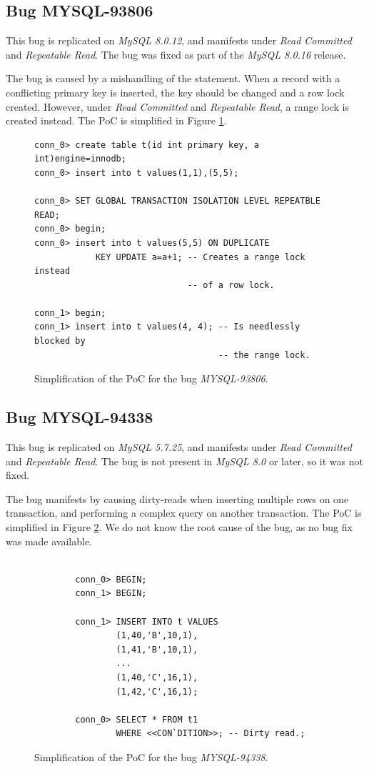\subsection*{Bug MYSQL-93806}

This bug is replicated on \textit{MySQL 8.0.12}, and manifests under \textit{Read Committed} and \textit{Repeatable Read}. The bug was fixed as part of the \textit{MySQL 8.0.16} release.

The bug is caused by a mishandling of the  statement. When a record with a conflicting primary key is inserted, the key should be changed and a row lock created. However, under \textit{Read Committed} and \textit{Repeatable Read}, a range lock is created instead. The PoC is simplified in Figure \ref{fig:MYSQL-93806}.

\begin{figure}
\begin{verbatim}
conn_0> create table t(id int primary key, a int)engine=innodb;
conn_0> insert into t values(1,1),(5,5);

conn_0> SET GLOBAL TRANSACTION ISOLATION LEVEL REPEATBLE READ;
conn_0> begin;
conn_0> insert into t values(5,5) ON DUPLICATE
            KEY UPDATE a=a+1; -- Creates a range lock instead
                              -- of a row lock.

conn_1> begin;
conn_1> insert into t values(4, 4); -- Is needlessly blocked by
                                    -- the range lock.
\end{verbatim}
\caption{Simplification of the PoC for the bug \textit{MYSQL-93806}.} \label{fig:MYSQL-93806}
\end{figure}


\subsection*{Bug MYSQL-94338}

This bug is replicated on \textit{MySQL 5.7.25}, and manifests under \textit{Read Committed} and \textit{Repeatable Read}. The bug is not present in \textit{MySQL 8.0} or later, so it was not fixed.

The bug manifests by causing dirty-reads when inserting multiple rows on one transaction, and performing a complex query on another transaction. The PoC is simplified in Figure \ref{fig:MYSQL-94338}. We do not know the root cause of the bug, as no bug fix was made available.

\begin{figure}
\begin{verbatim}

        conn_0> BEGIN;
        conn_1> BEGIN;

        conn_1> INSERT INTO t VALUES
                (1,40,'B',10,1),
                (1,41,'B',10,1),
                ...
                (1,40,'C',16,1),
                (1,42,'C',16,1);

        conn_0> SELECT * FROM t1
                WHERE <<CON`DITION>>; -- Dirty read.;
\end{verbatim}
\caption{Simplification of the PoC for the bug \textit{MYSQL-94338}.} \label{fig:MYSQL-94338}
\end{figure}

